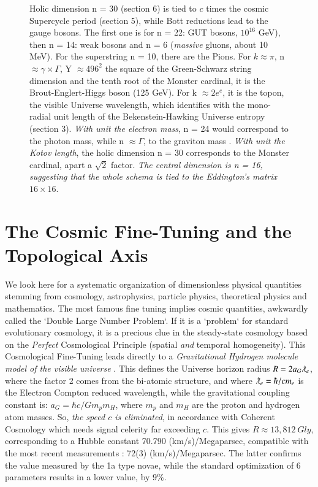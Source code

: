 \documentclass[twoside,draft]{article}
\begin{document}
\begin{sloppypar}
\begin{figure}
{    Holic dimension n = 30 (section 6) is tied to $c$ times the cosmic Supercycle period (section 5), while Bott reductions lead to the gauge bosons. The first one is for n = 22: GUT bosons, $10^{16}$ GeV), then n = 14: weak bosons and n = 6 (\textit{massive} gluons, about 10 MeV).
    For the superstring n = 10, there are the Pions. For $k \approx \pi$, n $\approx \gamma \times \Gamma$, Y $\approx 496^2$ 
    the square of the Green-Schwarz string dimension and the tenth root of the Monster cardinal, it is
    the Brout-Englert-Higgs boson (125 GeV). For k $\approx 2e^e$, it is the topon, the visible Universe wavelength,
    which identifies with the mono-radial unit length of the Bekenstein-Hawking Universe entropy (section 3).
   \textit{With unit the electron mass}, n = 24 would correspond to the photon mass, while n $\approx \Gamma$, 
    to the graviton mass \cite{sanchez 1}.
    \textit{With unit the Kotov length}, the holic dimension n = 30 corresponds to the Monster cardinal, 
    apart a $\sqrt2$ factor.}
    \textit{The central dimension is n = 16, suggesting that the whole schema is tied to the Eddington's matrix $16 \times 16$}.
\label{fig:figure_label}
\end{figure}


\section {The Cosmic Fine-Tuning and the Topological Axis}

We look here for a systematic organization of dimensionless physical quantities stemming from cosmology, astrophysics, particle   physics, theoretical physics and mathematics. The most famous fine tuning implies cosmic quantities, awkwardly called the `Double Large Number Problem`. If it is a `problem` for standard evolutionary cosmology, it is a precious clue in the steady-state cosmology based on the \textit{Perfect} Cosmological Principle (spatial \textit{and} temporal homogeneity).
This Cosmological Fine-Tuning leads directly to a \textit{Gravitational Hydrogen molecule model of the visible universe} \cite{Sanchez1}.
This defines the Universe horizon radius $R = 2a_{G} \lambdabar_{e}$, where the factor 2 comes from the bi-atomic structure, and where $\lambdabar_{e} = \hbar/cm_{e}$ is the Electron Compton reduced wavelength, while the gravitational coupling constant is: $a_{G} = \hbar c/Gm_{p}m_{H}$, where $m_p$ and $m_H$ are the proton and hydrogen atom masses. So, \textit{the speed $c$ is eliminated}, in accordance with Coherent Cosmology which needs signal celerity far exceeding $c$. This gives $R \approx 13,812~Gly $, corresponding to a Hubble constant 70.790 (km/s)/Megaparsec, compatible with the most recent measurements \cite{Bonvin}: 72(3) (km/s)/Megaparsec. The latter confirms the value measured by the 1a type novae, while the standard optimization of 6 parameters results in a lower value, by $9\%$.


\end{sloppypar}
\end{document}
